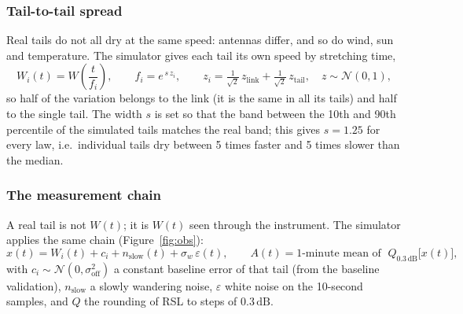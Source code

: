 \documentclass[11pt,a4paper]{article}
\newcommand{\dB}{\,\mathrm{dB}}
\begin{document}
\subsubsection*{Tail-to-tail spread}

Real tails do not all dry at the same speed: antennas differ, and so do wind, sun and temperature. The simulator
gives each tail its own speed by stretching time,
\begin{equation}
W_{i}(t) = W\!\left(\frac{t}{f_{i}}\right), \qquad f_{i} = e^{\,s\,z_{i}}, \qquad
z_{i} = \tfrac{1}{\sqrt{2}}\,z_{\text{link}} + \tfrac{1}{\sqrt{2}}\,z_{\text{tail}}, \quad z \sim \mathcal{N}(0,1),
\label{eq:spread}
\end{equation}
so half of the variation belongs to the link (it is the same in all its tails) and half to the single tail. The
width $s$ is set so that the band between the 10th and 90th percentile of the simulated tails matches the real band;
this gives $s = 1.25$ for every law, i.e.\ individual tails dry between 5 times faster and 5 times slower than the
median.

\subsubsection*{The measurement chain}

A real tail is not $W(t)$; it is $W(t)$ seen through the instrument. The simulator applies the same chain
(Figure~\ref{fig:obs}):
\begin{equation}
x(t) = W_{i}(t) + c_{i} + n_{\mathrm{slow}}(t) + \sigma_{w}\,\varepsilon(t), \qquad
A(t) = \text{1-minute mean of } \; Q_{0.3\dB}\bigl[x(t)\bigr],
\label{eq:obs}
\end{equation}
with $c_{i} \sim \mathcal{N}(0,\sigma_{\mathrm{off}}^{2})$ a constant baseline error of that tail (from the baseline
validation), $n_{\mathrm{slow}}$ a slowly wandering noise, $\varepsilon$ white noise on the 10-second samples, and
$Q$ the rounding of RSL to steps of $0.3\dB$.
\end{document}

